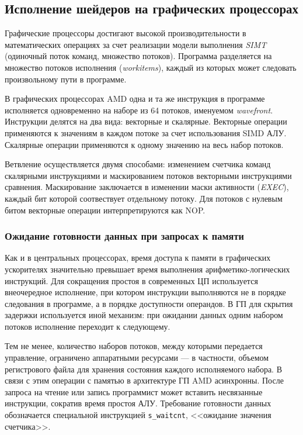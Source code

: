 \documentclass[a4paper,14pt]{extarticle}
\begin{document}
\subsection{Исполнение шейдеров на графических процессорах}

Графические процессоры достигают высокой производительности в математических операциях
за счет реализации модели выполнения \textit{SIMT} (одиночный поток команд, множество потоков).
Программа разделяется на множество потоков исполнения (\textit{workitems}),
каждый из которых может следовать произвольному пути в программе.

В графических процессорах AMD одна и та же инструкция в программе исполняется одновременно
на наборе из 64 потоков, именуемом \textit{wavefront}. Инструкции делятся на два вида:
векторные и скалярные. Векторные операции применяются к значениям в каждом потоке
за счет использования SIMD АЛУ. Скалярные операции применяются к одному значению на весь набор
потоков.

Ветвление осуществляется двумя способами: изменением счетчика команд скалярными инструкциями
и маскированием потоков векторными инструкциями сравнения. Маскирование заключается в изменении
маски активности (\textit{EXEC}), каждый бит которой соотвествует отдельному потоку.
Для потоков с нулевым битом векторные операции интерпретируются как NOP.

\subsubsection{Ожидание готовности данных при запросах к памяти}

Как и в центральных процессорах, время доступа к памяти в графических ускорителях
значительно превышает время выполнения арифметико-логических инструкций.
Для сокращения простоя в современных ЦП используется внеочередное исполнение, при котором
инструкции выполняются не в порядке следования в программе, а в порядке доступности операндов.
В ГП для скрытия задержки используется иной механизм: при ожидании данных одним набором
потоков исполнение переходит к следующему.

Тем не менее, количество наборов потоков, между которыми передается управление, ограничено
аппаратными ресурсами — в частности, объемом регистрового файла для хранения состояния каждого
исполняемого набора. В связи с этим операции с памятью в архитектуре ГП AMD асинхронны.
После запроса на чтение или запись программист может вставить несвязанные инструкции,
сократив время простоя АЛУ. Требование готовности данных обозначается специальной
инструкцией \texttt{s\_waitcnt}, <<ожидание значения счетчика>>.
\end{document}
